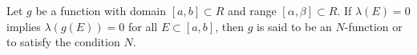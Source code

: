 Let $g$ be a function with domain $[a, b] \subset R$ and range $[\alpha, \beta] \subset R$. If $\lambda(E) = 0$ implies $\lambda(g(E)) = 0$ for all $E \subset [a, b]$, then $g$ is said to be an $N$-function or to satisfy the condition $N.$